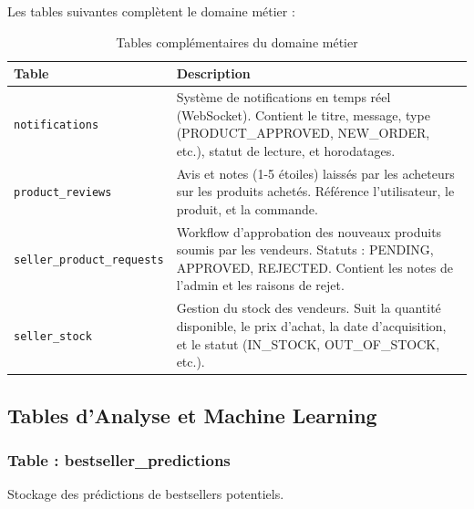 \documentclass[12pt,a4paper]{report}
\begin{document}
Les tables suivantes complètent le domaine métier :

\begin{table}[H]
    \centering
    \caption{Tables complémentaires du domaine métier}
    \begin{tabular}{lp{10cm}}
        \toprule
        \textbf{Table} & \textbf{Description} \\
        \midrule
        \texttt{notifications} & Système de notifications en temps réel (WebSocket). Contient le titre, message, type (PRODUCT\_APPROVED, NEW\_ORDER, etc.), statut de lecture, et horodatages. \\
        \midrule
        \texttt{product\_reviews} & Avis et notes (1-5 étoiles) laissés par les acheteurs sur les produits achetés. Référence l'utilisateur, le produit, et la commande. \\
        \midrule
        \texttt{seller\_product\_requests} & Workflow d'approbation des nouveaux produits soumis par les vendeurs. Statuts : PENDING, APPROVED, REJECTED. Contient les notes de l'admin et les raisons de rejet. \\
        \midrule
        \texttt{seller\_stock} & Gestion du stock des vendeurs. Suit la quantité disponible, le prix d'achat, la date d'acquisition, et le statut (IN\_STOCK, OUT\_OF\_STOCK, etc.). \\
        \bottomrule
    \end{tabular}
    \label{tab:other_domain_tables}
\end{table}

\subsection{Tables d'Analyse et Machine Learning}

\subsubsection{Table : bestseller\_predictions}

Stockage des prédictions de bestsellers potentiels.
\end{document}
